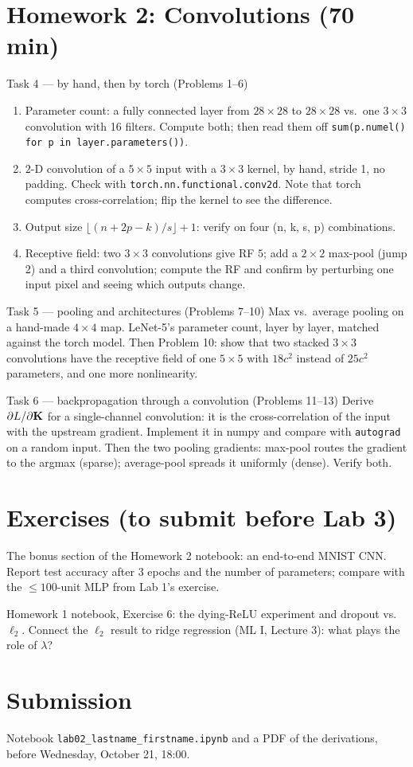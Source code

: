 \documentclass[11pt]{article}
\begin{document}
\section{Homework 2: Convolutions (70 min)}
\begin{task}{Task 4 --- by hand, then by torch (Problems 1--6)}
\begin{enumerate}[nosep]
  \item Parameter count: a fully connected layer from $28\times28$ to $28\times28$ vs.\ one $3\times3$ convolution with 16 filters. Compute both; then read them off \texttt{sum(p.numel() for p in layer.parameters())}.
  \item $2$-D convolution of a $5\times5$ input with a $3\times3$ kernel, by hand, stride 1, no padding. Check with \texttt{torch.nn.functional.conv2d}. Note that torch computes cross-correlation; flip the kernel to see the difference.
  \item Output size $\lfloor(n+2p-k)/s\rfloor+1$: verify on four (n, k, s, p) combinations.
  \item Receptive field: two $3\times3$ convolutions give RF $5$; add a $2\times2$ max-pool (jump 2) and a third convolution; compute the RF and confirm by perturbing one input pixel and seeing which outputs change.
\end{enumerate}
\end{task}
\begin{task}{Task 5 --- pooling and architectures (Problems 7--10)}
Max vs.\ average pooling on a hand-made $4\times4$ map. LeNet-5's parameter count, layer by layer, matched
against the torch model. Then Problem 10: show that two stacked $3\times3$ convolutions have the receptive
field of one $5\times5$ with $18c^2$ instead of $25c^2$ parameters, and one more nonlinearity.
\end{task}
\begin{task}{Task 6 --- backpropagation through a convolution (Problems 11--13)}
Derive $\partial L/\partial\mathbf{K}$ for a single-channel convolution: it is the cross-correlation of the input
with the upstream gradient. Implement it in numpy and compare with \texttt{autograd} on a random input.
Then the two pooling gradients: max-pool routes the gradient to the argmax (sparse); average-pool spreads
it uniformly (dense). Verify both.
\end{task}

\section{Exercises (to submit before Lab 3)}
\begin{exercise}
The bonus section of the Homework 2 notebook: an end-to-end MNIST CNN. Report test accuracy after 3 epochs
and the number of parameters; compare with the $\le100$-unit MLP from Lab 1's exercise.
\end{exercise}
\begin{exercise}
Homework 1 notebook, Exercise 6: the dying-ReLU experiment and dropout vs.\ $\ell_2$. Connect the
$\ell_2$ result to ridge regression (ML I, Lecture 3): what plays the role of $\lambda$?
\end{exercise}

\section*{Submission}
Notebook \texttt{lab02\_lastname\_firstname.ipynb} and a PDF of the derivations, before Wednesday, October 21, 18:00.
\end{document}
